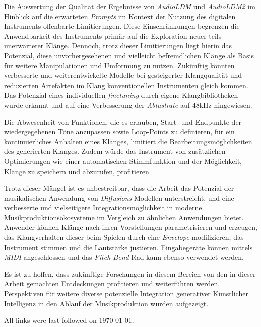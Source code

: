 \documentclass[
  a4paper,  %
  twoside,  %
  bibliography=totoc,
  headsepline,
  cleardoublepage=empty,
  parskip=half,
  draft=false
]{scrbook}
\begin{document}
Die Auswertung der Qualität der Ergebnisse von \emph{AudioLDM} \cite{liu_audioldm_2023} und \emph{AudioLDM2} \cite{liu_audioldm2_2023} im Hinblick auf die erwarteten \emph{Prompts} im Kontext der Nutzung des digitalen Instruments offenbarte Limitierungen. Diese Einschränkungen begrenzen die Anwendbarkeit des Instruments primär auf die Exploration neuer teils unerwarteter Klänge. Dennoch, trotz dieser Limitierungen liegt hierin das Potenzial, diese unvorhergesehenen und vielleicht befremdlichen Klänge als Basis für weitere Manipulationen und Umformung zu nutzen. Zukünftig könnten verbesserte und weiterentwickelte Modelle bei gesteigerter Klangqualität und reduzierten Artefakten im Klang konventionellen Instrumenten gleich kommen. Das Potenzial eines individuellen \emph{finetuning} durch eigene Klangbibliotheken wurde erkannt und auf eine Verbesserung der \emph{Abtastrate} auf $48$kHz hingewiesen. 

Die Abwesenheit von Funktionen, die es erlauben, Start- und Endpunkte der wiedergegebenen Töne anzupassen sowie Loop-Points zu definieren, für ein kontinuierliches Anhalten eines Klanges, limitiert die Bearbeitungsmöglichkeiten des generierten Klanges. Zudem würde das Instrument von zusätzlichen Optimierungen wie einer automatischen Stimmfunktion und der Möglichkeit, Klänge zu speichern und abzurufen, profitieren.

Trotz dieser Mängel ist es unbestreitbar, dass die Arbeit das Potenzial der musikalischen Anwendung von \emph{Diffusions}-Modellen unterstreicht, und eine verbesserte und vielseitigere Integrationsmöglichkeit in moderne Musikproduktionsökosysteme im Vergleich zu ähnlichen Anwendungen bietet. Anwender können Klänge nach ihren Vorstellungen parametrisieren und erzeugen, das Klangverhalten dieser beim Spielen durch eine \emph{Envelope} modifizieren, das Instrument stimmen und die Lautstärke justieren. Eingabegeräte können mittels \emph{MIDI} angeschlossen und das \emph{Pitch-Bend}-Rad kann ebenso verwendet werden.

Es ist zu hoffen, dass zukünftige Forschungen in diesem Bereich von den in dieser Arbeit gemachten Entdeckungen profitieren und weiterführen werden. Perspektiven für weitere diverse potenzielle Integration generativer Künstlicher Intelligenz in den Ablauf der Musikproduktion wurden aufgezeigt. 

\label{sec:conclusion}


\printbibliography

All links were last followed on \today{}.
\end{document}
